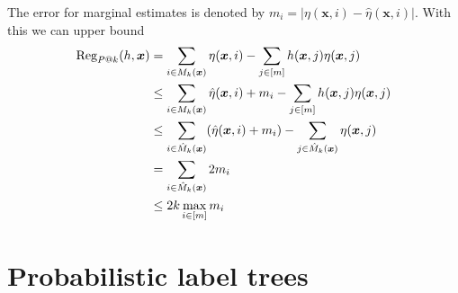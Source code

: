 \documentclass{article}
\renewcommand{\vec}[1]{\boldsymbol{#1}}
\newcommand{\bx}{\vec{x}}
\begin{document}
The error for marginal estimates is denoted by $m_i = \vert \eta (\bx ,i ) - \hat{\eta} (\bx ,i )\vert$. With this we can upper bound 
\begin{align}
\mbox{Reg}_{P@k} (h, \bx) 
  & = \sum_{i \in M_k(\bx)} \eta (\bx ,i ) - \sum_{j \in [m]} h(\bx, j) \eta(\bx , j ) \notag \\
  & \le \sum_{i \in M_k(\bx)} \hat{\eta} (\bx ,i ) + m_i - \sum_{j \in [m]} h(\bx, j) \eta(\bx , j ) \notag \\ 
  & \le \sum_{i \in \hat{M}_k(\bx)} (\hat{\eta} (\bx ,i ) + m_i )- \sum_{j \in \hat{M}_k(\bx)}  \eta(\bx , j ) \notag \\
  & = \sum_{i \in \hat{M}_k(\bx)} 2m_i \notag \\
  & \le 2k\max_{i \in [m]} m_i
\end{align}

\section{Probabilistic label trees}
\label{app:plt}
\end{document}
